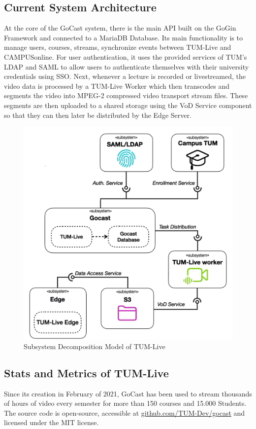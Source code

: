 \subsection{Current System Architecture}

At the core of the GoCast system, there is the main \ac{API} built on the GoGin Framework and connected to a MariaDB Database. Its main functionality is to manage users, courses, streams, synchronize events between TUM-Live and CAMPUSonline. For user authentication, it uses the provided services of \ac{TUM}'s \ac{LDAP} and \ac{SAML} to allow users to authenticate themselves with their university credentials using \ac{SSO}. 
Next, whenever a lecture is recorded or livestreamed, the video data is processed by a TUM-Live Worker which then transcodes and segments the video into MPEG-2 compressed video transport stream files. These segments are then uploaded to a shared storage using the VoD Service component so that they can then later be distributed by the Edge Server.

\begin{figure}[htpb]
    \centering
    \includegraphics[width=320pt]{images/OldDeploymentDiagram.png}
    \caption[Subsystem Decomposition]{Subsystem Decomposition Model of TUM-Live}\label{fig:system-architecture}
\end{figure}

\subsection{Stats and Metrics of TUM-Live}

Since its creation in February of 2021, GoCast has been used to stream thousands of hours of video every semester for more than 150 courses and 15.000 Students. The source code is open-source, accessible at \href{https://github.com/TUM-Dev/gocast}{github.com/TUM-Dev/gocast} and licensed under the MIT license.


